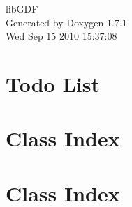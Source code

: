 \documentclass[a4paper]{book}
\begin{document}
\hypersetup{pageanchor=false}
\begin{titlepage}
\vspace*{7cm}
\begin{center}
{\Large libGDF }\\
\vspace*{1cm}
{\large Generated by Doxygen 1.7.1}\\
\vspace*{0.5cm}
{\small Wed Sep 15 2010 15:37:08}\\
\end{center}
\end{titlepage}
\clearemptydoublepage
{}
\tableofcontents
\clearemptydoublepage
{}
\hypersetup{pageanchor=true}
\chapter{Todo List}
\label{todo}
\hypertarget{todo}{}

\chapter{Class Index}

\chapter{Class Index}

\end{document}
